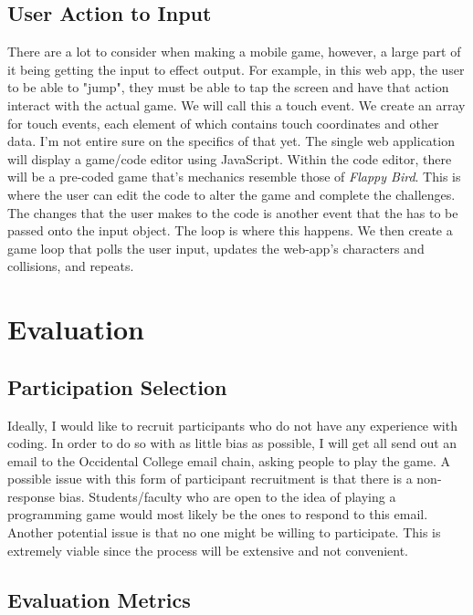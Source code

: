 \documentclass[10pt,twocolumn]{article}
\begin{document}
\subsection{User Action to Input}
There are a lot to consider when making a mobile game, however, a large part of it being getting the input to effect output. For example, in this web app, the user to be able to "jump", they must be able to tap the screen and have that action interact with the actual game. We will call this a touch event. We create an array for touch events, each element of which contains touch coordinates and other data. I'm not entire sure on the specifics of that yet. 
The single web application will display a game/code editor using JavaScript. Within the code editor, there will be a pre-coded game that’s mechanics resemble those of \textit{Flappy Bird}. This is where the user can edit the code to alter the game and complete the challenges. The changes that the user makes to the code is another event that the has to be passed onto the input object. The loop is where this happens. We then create a game loop that polls the user input, updates the web-app's characters and collisions, and repeats.




\section{Evaluation}

\subsection{Participation Selection}
Ideally, I would like to recruit participants who do not have any experience with coding. In order to do so with as little bias as possible, I will get all send out an email to the Occidental College email chain, asking people to play the game. A possible issue with this form of participant recruitment is that there is a non-response bias. Students/faculty who are open to the idea of playing a programming game would most likely be the ones to respond to this email. Another potential issue is that no one might be willing to participate. This is extremely viable since the process will be extensive and not convenient.
\subsection{Evaluation Metrics}
\end{document}
